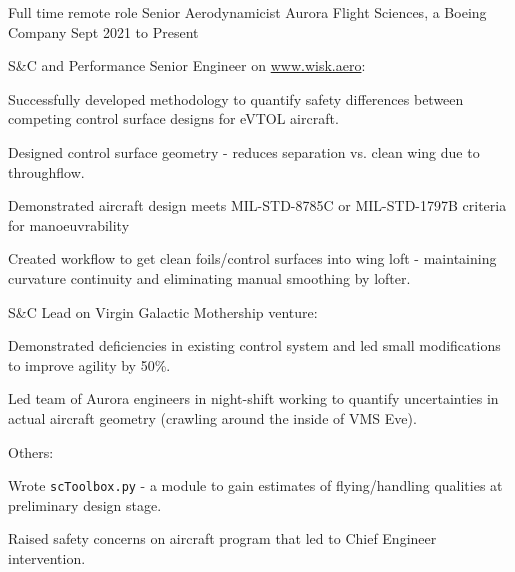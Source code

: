 \begin{cventries}
\cventry
    {Full time remote role} %
    {Senior Aerodynamicist} %
    {Aurora Flight Sciences, a Boeing Company} %
    {Sept 2021 to Present} %
    {S\&C and Performance Senior Engineer on \href{www.wisk.aero}{www.wisk.aero}:\vspace{.5cm}
    \begin{cvitems}
    	\item Successfully developed methodology to quantify safety differences between competing control surface designs for eVTOL aircraft.
    	\item Designed control surface geometry - reduces separation vs. clean wing due to throughflow.
    	\item Demonstrated aircraft design meets MIL-STD-8785C or MIL-STD-1797B criteria for manoeuvrability
    	\item Created workflow to get clean foils/control surfaces into wing loft - maintaining curvature continuity and eliminating manual smoothing by lofter.
    \end{cvitems}
    \vspace{.5cm}
    S\&C Lead on Virgin Galactic Mothership venture:\vspace{.5cm}
    \begin{cvitems}
    	\item Demonstrated deficiencies in existing control system and led small modifications to improve agility by 50\%.
    	\item Led team of Aurora engineers in night-shift working to quantify uncertainties in actual aircraft geometry (crawling around the inside of VMS Eve).
    \end{cvitems}
	\vspace{.5cm}
    Others:\vspace{.5cm}
    \begin{cvitems}
    	\item Wrote \texttt{scToolbox.py} - a module to gain estimates of flying/handling qualities at preliminary design stage.
     	\item Raised safety concerns on aircraft program that led to Chief Engineer intervention.
    \end{cvitems}
    }



\end{cventries}
